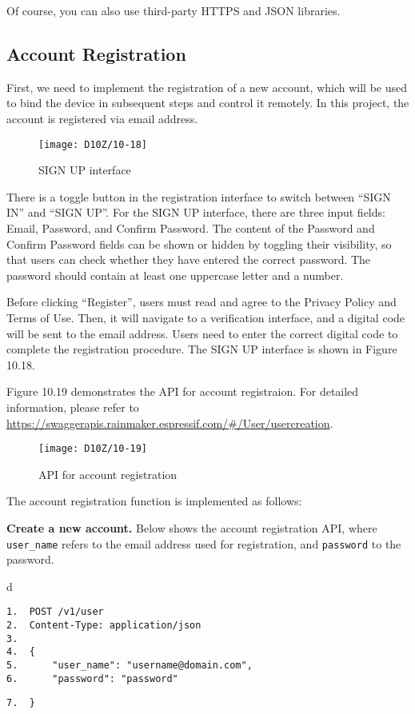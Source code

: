 \documentclass[a4paper,12pt]{book}
\begin{document}
Of course, you can also use third-party HTTPS and JSON libraries.

\subsection{Account Registration}
First, we need to implement the registration of a new account, which will be used to bind the device in subsequent steps and control it remotely. In this project, the account is registered via email address.

\begin{figure}[ht]
    \centering
    \texttt{[image: D10Z/10-18]}
    \caption{SIGN UP interface}
\end{figure}

There is a toggle button in the registration interface to switch between “SIGN IN” and “SIGN UP”. For the SIGN UP interface, there are three input fields: Email, Password, and Confirm Password. The content of the Password and Confirm Password fields can be shown or hidden by toggling their visibility, so that users can check whether they have entered the correct password. The password should contain at least one uppercase letter and a number.

Before clicking “Register”, users must read and agree to the Privacy Policy and Terms of Use. Then, it will navigate to a verification interface, and a digital code will be sent to the email address. Users need to enter the correct digital code to complete the registration procedure. The SIGN UP interface is shown in Figure 10.18.

Figure 10.19 demonstrates the API for account registraion. For detailed information, please refer to \url{https://swaggerapis.rainmaker.espressif.com/\#/User/usercreation}.

\begin{figure}[ht]
    \centering
    \texttt{[image: D10Z/10-19]}
    \caption{API for account registration}
\end{figure}

The account registration function is implemented as follows:

\textbf{Create a new account.} Below shows the account registration API, where \verb|user_name| refers to the email address used for registration, and \verb|password| to the password.

\begin{codebloc}
\begin{tabular}{d}
\vspace{2pt}
\begin{verbatim}
1.  POST /v1/user
2.  Content-Type: application/json
3.	
4.  {
5.      "user_name": "username@domain.com",
6.      "password": "password"
\end{verbatim}
\verb|7.  }|
\end{tabular}
\end{codebloc}
\end{document}
